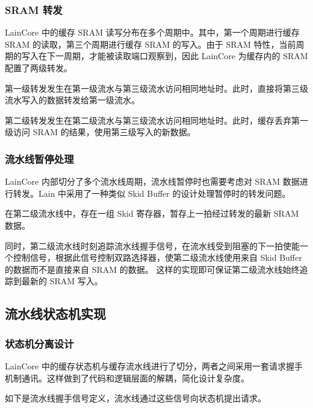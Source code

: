 \subsubsection{SRAM 转发}\label{sec:04-advanced-cpu-020}

LainCore 中的缓存 SRAM 读写分布在多个周期中。其中，第一个周期进行缓存 SRAM 的读取，第三个周期进行缓存 SRAM 的写入。由于 SRAM 特性，当前周期的写入在下一周期，才能被读取端口观察到，因此 LainCore 为缓存内的 SRAM 配置了两级转发。

第一级转发发生在第一级流水与第三级流水访问相同地址时。此时，直接将第三级流水写入的数据转发给第一级流水。

第二级转发发生在第二级流水与第三级流水访问相同地址时。此时，缓存丢弃第一级访问 SRAM 的结果，使用第三级写入的新数据。

\subsubsection{流水线暂停处理}\label{sec:04-advanced-cpu-021}

LainCore 内部切分了多个流水线周期，流水线暂停时也需要考虑对 SRAM 数据进行转发。Lain 中采用了一种类似 Skid Buffer 的设计处理暂停时的转发问题。

在第二级流水线中，存在一组 Skid 寄存器，暂存上一拍经过转发的最新 SRAM 数据。

同时，第二级流水线时刻追踪流水线握手信号，在流水线受到阻塞的下一拍使能一个控制信号，根据此信号控制双路选择器，使第二级流水线使用来自 Skid Buffer 的数据而不是直接来自 SRAM 的数据。 这样的实现即可保证第二级流水线始终追踪到最新的 SRAM 写入。

\subsection{流水线状态机实现}\label{sec:04-advanced-cpu-022}

\subsubsection{状态机分离设计}\label{sec:04-advanced-cpu-023}

LainCore 中的缓存状态机与缓存流水线进行了切分，两者之间采用一套请求握手机制通讯。这样做到了代码和逻辑层面的解耦，简化设计复杂度。

如下是流水线握手信号定义，流水线通过这些信号向状态机提出请求。

